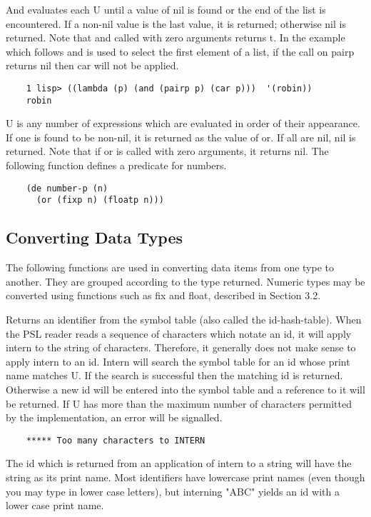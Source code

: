 {    And evaluates each U until a value of nil is  found  or  the
    end  of  the    list is encountered.  If  a non-nil value is
    the last value, it is returned; otherwise nil  is  returned.
    Note  that and called with zero arguments returns t.  In the
    example which follows  and  is  used  to  select  the  first
    element of a list, if the call on pairp returns nil then car
    will not be applied.
}
\begin{verbatim}
    1 lisp> ((lambda (p) (and (pairp p) (car p)))  '(robin))
    robin
\end{verbatim}
{    U is any number of expressions  which are evaluated in order
    of  their  appearance.  If one is found to be non-nil, it is
    returned as the value of  or.    If  all  are  nil,  nil  is
    returned.  Note that if or is called with zero arguments, it
    returns nil.  The following function defines a predicate for
    numbers.
}
\begin{verbatim}
    (de number-p (n)
      (or (fixp n) (floatp n)))
\end{verbatim}
\subsection{Converting Data Types}

The following functions are used in converting data items from
one  type  to  another.   They are grouped according to the type
returned.  Numeric types may be converted using  functions  such
as fix and float, described in Section 3.2.


{    Returns an identifier from the symbol table (also called the
    id-hash-table).   When  the  PSL  reader reads a sequence of
    characters which notate an id, it will apply intern  to  the
    string of characters.  Therefore, it generally does not make
    sense  to  apply  intern  to  an id.  Intern will search the
    symbol table for an id whose print name matches U.   If  the
    search  is  successful  then  the  matching  id is returned.
    Otherwise a new id will be entered into the symbol table and
    a reference to it will be returned.  If U has more than  the
    maximum    number    of    characters   permitted   by   the
    implementation, an error will be signalled.
}
\begin{verbatim}
    ***** Too many characters to INTERN
\end{verbatim}
    The id which is returned from an application of intern to  a
    string  will  have  the  string  as  its  print  name.  Most
    identifiers have lowercase print names (even though you  may
    type  in  lower case letters), but interning "ABC" yields an
    id with a lower case print name.

